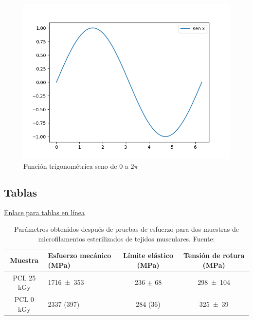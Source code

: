     \begin{figure}[h!]
        \centering
        \includegraphics[scale=0.8]{figuras/Figure_1.png}
        \caption{Función trigonométrica seno de $0$ a $2\pi$}
        \label{fig:funcion_seno}
    \end{figure}
   \newpage
    \subsection{Tablas}
\href{https://www.tablesgenerator.com/}{Enlace para tablas en línea}


\begin{table}[h!]
    \caption{ Parámetros obtenidos después de pruebas de esfuerzo para dos muestras de microfilamentos esterilizados de tejidos musculares. Fuente: \cite{Rojas2022}  \\}
    \label{tabla:ejemplo_1} 
    \centering
        \begin{tabular}{c m{2cm} c c}
            \toprule
            Muestra                &  \centering Esfuerzo mecánico (\si{\mega\pascal})          & Límite elástico (\si{\mega\pascal})        & Tensión de rotura (\si{\mega\pascal})         \\ \midrule
            PCL 25 \si{\kilo\gray} & \num{1716(353)} & \num{236} $\pm$ \num{68} & \num{298(104)} \\
            PCL 0 \si{\kilo\gray}  & \num{2337 (397)}  & \num{284 (36)} & \num{325(39)}   \\ \bottomrule
    \end{tabular}
\end{table}
      

